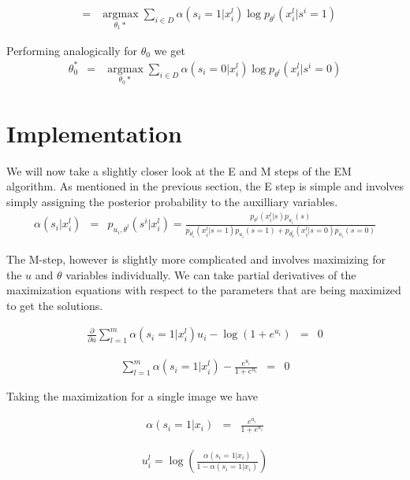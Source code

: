 \documentclass[11pt]{article}
\DeclareMathOperator*{\argmax}{argmax}
\begin{document}
\begin{eqnarray}
&=& \argmax\limits_{\theta_1*} \sum_{ i \in D} \alpha(s_i = 1 | x_i^l) \log p_{\theta^l}(x_i^l|s^i = 1)
\end{eqnarray}

Performing analogically for $\theta_0$ we get
\begin{eqnarray}
\theta_0^* &=& \argmax\limits_{\theta_0*} \sum_{ i \in D} \alpha(s_i = 0 | x_i^l) \log p_{\theta^l}(x_i^l|s^i = 0)
\end{eqnarray}

\section{Implementation}
We will now take a slightly closer look at the E and M steps of the EM algorithm. As mentioned in the previous section, the E step is simple and involves simply assigning the posterior probability to the auxilliary variables. \\

\begin{eqnarray}
\alpha(s_i | x_i^l) &=& p_{u_i,\theta^l}(s^i | x_i^l) = \frac{p_{\theta^l}(x_i^l | s) p_{u_i}(s)}
{p_{\theta^l_1}(x_i^l|s=1)p_{u_i}(s=1) + p_{\theta^l_0}(x_i^l|s=0)p_{u_i}(s=0)}
\end{eqnarray}


The M-step, however is slightly more complicated and involves maximizing for the $u$ and $\theta$ variables individually. We can take partial derivatives of the maximization equations with respect to the parameters that are being maximized to get the solutions. 

\begin{eqnarray}
\frac{\partial}{\partial u}\sum_{l=1}^m \alpha(s_i = 1 | x_i^l)u_i - \log (1 + e^{u_i}) &=& 0
\end{eqnarray}

\begin{eqnarray}
\sum_{l=1}^m \alpha(s_i = 1 | x_i^l) -  \frac{e^{u_i}}{1 + e^{u_i}} &=& 0
\end{eqnarray}

Taking the maximization for a single image we have 

\begin{eqnarray}
\alpha(s_i = 1 | x_i) &=&  \frac{e^{u_i}}{1 + e^{u_i}} 
\end{eqnarray}

\begin{eqnarray}
u_i^l = \log (\frac{\alpha(s_i = 1 | x_i)}{1 - \alpha(s_i = 1 | x_i)})
\end{eqnarray}
\end{document}
